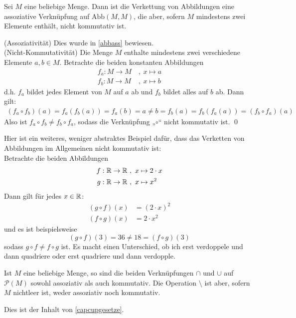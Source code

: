 \begin{bsp} \label{verkett}
Sei $M$ eine beliebige Menge. Dann ist die Verkettung von Abbildungen eine assoziative Verknüpfung auf $\text{Abb}(M,M)$, die aber, sofern $M$ mindestens zwei Elemente enthält, nicht kommutativ ist. 
\end{bsp}
\begin{bew}[(*)]
 (Assoziativität) Dies wurde in \cref{abbass} bewiesen. \\[0.5em]
 (Nicht-Kommutativität) Die Menge $M$ enthalte mindestens zwei verschiedene Elemente $a,b\in M$. Betrachte die beiden konstanten Abbildungen
 \begin{align*}
  f_a : M\to M \ &,\ x\mapsto a \\
  f_b : M\to M \ &,\ x\mapsto b  
 \end{align*}
d.h. $f_a$ bildet jedes Element von $M$ auf $a$ ab und $f_b$ bildet alles auf $b$ ab. Dann gilt:
\begin{align*}
 (f_a\circ f_b)(a) = f_a(f_b(a)) = f_a(b)=a \neq b = f_b(a)=f_b(f_a(a))=(f_b\circ f_a)(a)
\end{align*}
Also ist $f_a\circ f_b\neq f_b\circ f_a$, sodass die Verknüpfung „$\circ$“ nicht kommutativ ist. \qed
\end{bew}






\begin{bsp}
 Hier ist ein weiteres, weniger abstraktes Beispiel dafür, dass das Verketten von Abbildungen im Allgemeinen nicht kommutativ ist: \\
 Betrachte die beiden Abbildungen
 \begin{align*}
  f: {\mathbb R} \to {\mathbb R} \ &,\ x\mapsto 2\cdot x \\
  g  : {\mathbb R} \to {\mathbb R} \ &,\ x\mapsto x^2
 \end{align*}
Dann gilt für jedes $x\in {\mathbb R}$:
\begin{align*}
(g\circ f)(x) & = (2\cdot x)^2 \\
(f\circ g)(x) & = 2\cdot x^2
\end{align*}
und es ist beispielsweise
\[ (g\circ f)(3)  = 36 \neq 18 = (f\circ g)(3) \]
sodass $g\circ f\neq f\circ g$ ist. Es macht einen Unterschied, ob ich erst verdoppele und dann quadriere oder erst quadriere und dann verdopple.
\end{bsp}



\begin{bsp}[Mengenverknüpfungen]
 Ist $M$ eine beliebige Menge, so sind die beiden Verknüpfungen $\cap$ und $\cup$ auf $\mathcal{P}(M)$ sowohl assoziativ als auch kommutativ. Die Operation $\setminus$ ist aber, sofern $M$ nichtleer ist, weder assoziativ noch kommutativ.
\end{bsp}
\begin{bew}
Dies ist der Inhalt von \cref{capcupgesetze}.
\end{bew}




